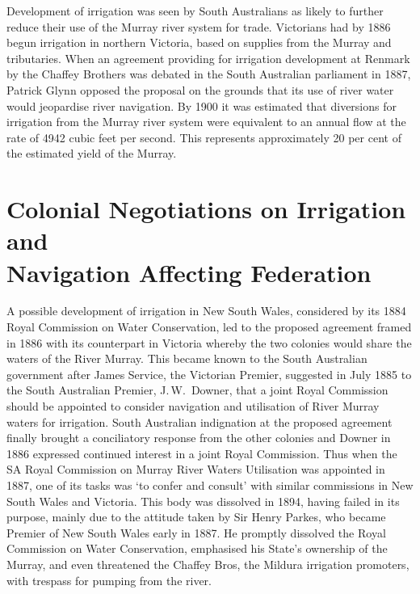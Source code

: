 Development of irrigation was seen by South Australians as likely to
further reduce their use of the Murray river system for trade.
Victorians had by 1886 begun irrigation in northern Victoria, based on
supplies from the Murray and tributaries.  When an agreement providing
for irrigation development at Renmark  by the
Chaffey Brothers  was debated in the South
Australian parliament in 1887, Patrick Glynn 
opposed the proposal on the grounds that its use of river water would
jeopardise river navigation. By 1900 it was estimated that diversions
for irrigation from the Murray river system were equivalent to an
annual flow at the rate of 4942 cubic feet per second. This represents
approximately 20 per cent of the estimated yield of the
Murray.

\section*{Colonial Negotiations on Irrigation and \\
Navigation Affecting Federation}

A possible development of irrigation in New South Wales, considered by
its 1884 Royal Commission on Water Conservation,  led to the proposed agreement
framed in 1886 with its counterpart in Victoria where\-by the two
colonies would share the waters of the River Murray. This became known
to the South Australian government after James Service,
 the Victorian Premier, suggested in July 1885 to
the South Australian Premier, J.\,W.~Downer, 
that a joint Royal Commission should be appointed to consider
navigation and utilisation of River Murray waters for irrigation.
South Australian indignation at the proposed agreement finally brought
a conciliatory response from the other colo\-nies and Downer in 1886
expressed continued interest in a joint Royal Commission.  Thus when
the SA Royal Commission on Murray River Waters Utilisation was
appointed in 1887,  one of its tasks was `to confer and consult' with similar
commissions in New South Wales and Victoria.  This body was dissolved
in 1894, having failed in its purpose, mainly due to the attitude
taken by Sir Henry Parkes,  who became Premier of
New South Wales early in 1887.  He promptly dissolved the Royal
Commission on Water Conservation, emphasised his State's ownership of
the Murray, and even threatened the Chaffey Bros, the Mildura
irrigation promoters, with trespass for pumping from the river.

